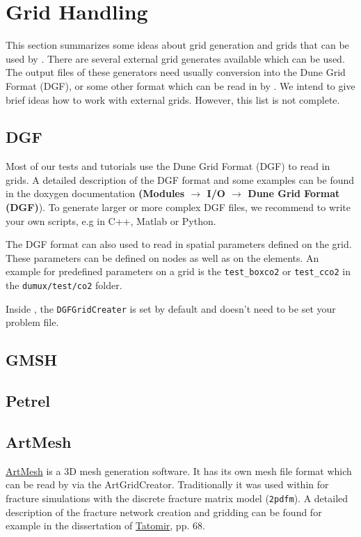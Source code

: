 \section{Grid Handling}
\label{sec:gridhandling}

This section summarizes some ideas about grid generation and grids that can be used by \Dumux. There are several external grid generates available which can be used. The output files of these generators need usually conversion into the Dune Grid Format (DGF), or some other format which can be read in by \Dune. We intend to give brief ideas how to work with external grids. However, this list is not complete.

\subsection{DGF}
Most of our \Dumux tests and tutorials use the Dune Grid Format (DGF) to read in grids. A detailed description of the DGF format and some examples can be found in the \Dune doxygen documentation \textbf{(Modules $\rightarrow$ I/O $\rightarrow$ Dune Grid Format (DGF)}). To generate larger or more complex DGF files, we recommend to write your own scripts, e.g in C++, Matlab or Python.

The DGF format can also used to read in spatial parameters defined on the grid. These parameters can be defined on nodes as well as on the elements. An example for predefined parameters on a grid is the \texttt{test\_boxco2} or \texttt{test\_cco2} in the  \texttt{dumux/test/co2} folder.

Inside \Dumux, the \texttt{DGFGridCreater} is set by default and doesn't need to be set your problem file.


\subsection{GMSH}


\subsection{Petrel}


\subsection{ArtMesh}
\href{http://www.topologica.org/toplog/wp/}{ArtMesh} is a 3D mesh generation software. It has its own mesh file format
which can be read by \Dumux via the ArtGridCreator. Traditionally it was used within \Dumux for fracture simulations with
the discrete fracture matrix model (\texttt{2pdfm}). A detailed description of the fracture network creation and gridding
can be found for example in the dissertation of \href{http://elib.uni
-stuttgart.de/opus/frontdoor.php?source_opus=8047&la=de}{Tatomir}, pp. 68.

